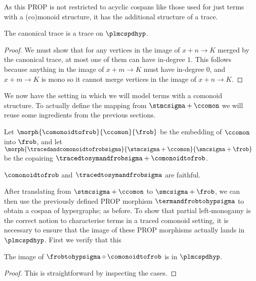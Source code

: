 As this PROP is not restricted to acyclic cospans like those used for just
terms with a (co)monoid structure, it has the additional structure of a trace.

\begin{proposition}
    The canonical trace is a trace on \(\plmcspdhyp\).
\end{proposition}
\begin{proof}
    We must show that for any vertices in the image
    of \(x + n \to K\) merged by the canonical trace, at most one of them can
    have in-degree \(1\).
    This follows because anything in the image of
    \(x + m \to K\) must have in-degree \(0\), and \(x + m \to K\) is
    mono so it cannot merge vertices in the image of \(x + n \to K\).
\end{proof}

We now have the setting in which we will model terms with a comonoid structure.
To actually define the mapping from \(\stmcsigma + \ccomon\) we will reuse
some ingredients from the previous sections.

\begin{definition}
    Let \(
    \morph{
        \comonoidtofrob
    }{
        \ccomon
    }{
        \frob
    }
    \) be the embedding of \(\ccomon\) into \(\frob\), and let \(
    \morph{
        \tracedandcomonoidtofrobsigma
    }{
        \stmcsigma + \ccomon
    }{
        \smcsigma + \frob
    }
    \) be the copairing \(\tracedtosymandfrobsigma + \comonoidtofrob\).
\end{definition}

\begin{corollary}
    \(\comonoidtofrob\) and \(\tracedtosymandfrobsigma\) are faithful.
\end{corollary}

After translating from \(\stmcsigma + \ccomon\) to \(\smcsigma + \frob\),
we can then use the previously defined PROP morphism \(\termandfrobtohypsigma\)
to obtain a cospan of hypergraphs; as before.
To show that partial left-monogamy is the correct notion to characterise terms
in a traced comonoid setting, it is necessary to ensure that the image of these
PROP morphisms actually lands in \(\plmcspdhyp\).
First we verify that this

\begin{lemma}
    The image of \(\frobtohypsigma \circ \comonoidtofrob\) is in
    \(\plmcspdhyp\).
\end{lemma}
\begin{proof}
    This is straightforward by inspecting the cases.
\end{proof}

